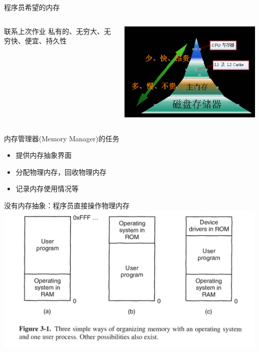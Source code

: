 \documentclass[xcolor=svgnames]{beamer}
\begin{document}
\begin{CJK*}{UTF8}{gbsn}
\begin{frame}{程序员希望的内存}
\begin{columns}%
\begin{block}{联系上次作业}
私有的、无穷大、无穷快、便宜、持久性
\end{block}
\includegraphics[width=1.0\textwidth]{memory_hier.jpg}
\end{columns}%
\end{frame}

\begin{frame}{内存管理器(Memory Manager)的任务}
\begin{itemize}
\item 提供内存抽象界面
\item 分配物理内存，回收物理内存
\item 记录内存使用情况等
\end{itemize}
\end{frame}

\begin{frame}{没有内存抽象：程序员直接操作物理内存}
\includegraphics[width=1.0\textwidth]{nomem.png}


\end{frame}
\end{CJK*}
\end{document}
